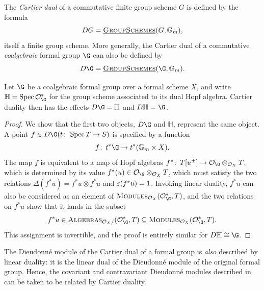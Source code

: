 \begin{definition}\label{DefnCartierDual}
The \textit{Cartier dual} of a commutative finite group scheme \(G\) is defined by the formula \[DG = \operatorname{\underline{\smash{\normalfont\textsc{GroupSchemes}}}}(G, \mathbb G_m),\] itself a finite group scheme.
More generally, the Cartier dual of a commutative \emph{coalgebraic} formal group \(\G\) can also be defined by \[D\G = \InternalHom{GroupSchemes}(\G, \Gm).\]
\end{definition}

\begin{lemma}
Let \(\G\) be a coalgebraic formal group over a formal scheme \(X\), and write \(\mathbb H = \Spec \sheaf O_{\G}^*\) for the group scheme associated to its dual Hopf algebra.
Cartier duality then has the effects \(D\G = \mathbb H\) and \(D\mathbb H = \G\).
\end{lemma}
\begin{proof}
We show that the first two objects, \(D\G\) and \(\mathbb H\), represent the same object.
A point \(f \in D\G(t\co \Spec T \to S)\) is specified by a function \[f\co t^* \G \to t^*(\Gm \times X).\]
The map \(f\) is equivalent to a map of Hopf algebras \(f^*\co T[u^\pm] \to \sheaf O_{\G} \otimes_{\sheaf O_X} T\), which is determined by its value \(f^*(u) \in \sheaf O_{\G} \otimes_{\sheaf O_X} T\), which must satisfy the two relations \(\Delta(f^* u) = f^* u \otimes f^* u\) and \(\varepsilon(f^* u) = 1\).
Invoking linear duality, \(f^* u\) can also be considered as an element of \(\CatOf{Modules}_{\sheaf O_X}(\sheaf O_{\G}^*, T)\), and the two relations on \(f^* u\) show that it lands in the subset \[f^* u \in \CatOf{Algebras}_{\sheaf O_X /}(\sheaf O_{\G}^*, T) \subseteq \CatOf{Modules}_{\sheaf O_X}(\sheaf O_{\G}^*, T).\]
This assignment is invertible, and the proof is entirely similar for \(D \mathbb H \cong \G\).
\end{proof}

\begin{remark}
The Dieudonn\'e module of the Cartier dual of a formal group is \emph{also} described by linear duality: it is the linear dual of the Dieudonn\'e module of the original formal group.
Hence, the covariant and contravariant Dieudonn\'e modules described in  can be taken to be related by Cartier duality.
\end{remark}

